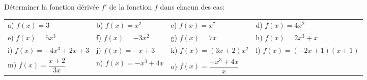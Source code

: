 \documentclass[10pt,a4paper,openany,twoside, eleve]{book}
\begin{document}
\begin{exon}
  Déterminer la fonction dérivée $f'$ de la fonction $f$ dans chacun des
  cas:

  \begin{tabular}{llll}
    a) $f(x)=3$
     & b) $f(x)=x^2$
     & c) $f(x)=x^7$
     & d) $f(x)=4x^2$
    \\[0.4cm]
    e) $f(x)=5x^3$
     & f) $f(x)=-3x^2$
     & g) $f(x)=7x$
     & h) $f(x)=2x^3+x$
    \\[0.4cm]
    i) $f(x)=-4x^3+2x+3$
     & j) $f(x)=-x+3$
     & k) $f(x)=(3x+2)x^2$
     & l) $f(x)=(-2x+1)(x+1)$
    \\[0.4cm]
    m) $f(x)=\dfrac{x+2}{3x}$
     & n) $f(x)=-x^3+4x$
     & o) $f(x)=\dfrac{-x^3+4x}{x}$
    \\[0.4cm]
  \end{tabular}

  \vspace{5mm}
\end{exon}
\end{document}
